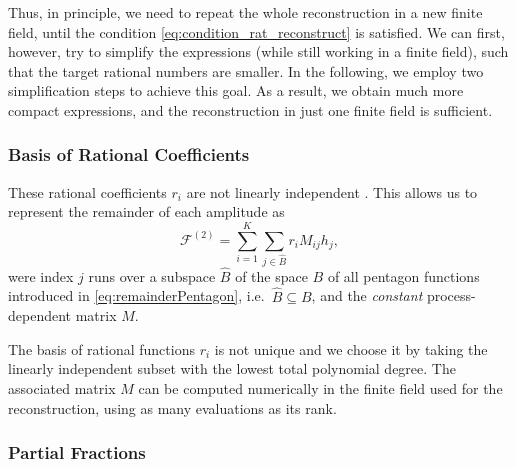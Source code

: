 Thus, in principle, we need to repeat the whole reconstruction in a new finite field, until the condition
\cref{eq:condition_rat_reconstruct} is satisfied.
We can first, however, try to simplify the expressions (while still working in a finite field),
such that the target rational numbers are smaller.
In the following, we employ two simplification steps to achieve this goal.
As a result, we obtain much more compact expressions,
and the reconstruction in just one finite field is sufficient. 

\subsubsection{Basis of Rational Coefficients}

These rational coefficients $r_i$ are not linearly independent \cite{Abreu:2018aqd,Chicherin:2018yne,Abreu:2019rpt,Chicherin:2019xeg}.
This allows us to represent the remainder of each amplitude as
\begin{equation} \label{eq:remainderDecomposition}
  \mathcal{F}^{(2)} = 
  \sum_{i=1}^K \sum_{j\in \hat B} r_i M_{ij} h_j,
\end{equation}
were index $j$ runs over a subspace $\hat B$ of the space $B$ of all pentagon functions 
introduced in \cref{eq:remainderPentagon}, i.e.\  $\hat B\subseteq B$,
and the \emph{constant} process-dependent matrix $M$.

The basis of rational functions $r_i$ is not unique
and we choose it by taking the linearly independent subset with
the lowest total polynomial degree. The associated matrix $M$
can be computed numerically in the finite field used for the reconstruction,
using as many evaluations as its rank. 



\subsubsection{Partial Fractions}

